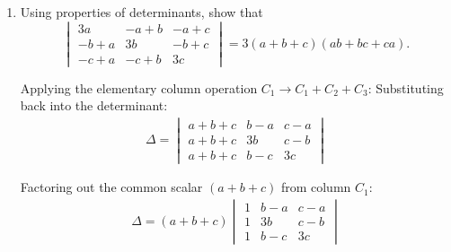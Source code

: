 \begin{enumerate}[label=\thesubsection.\arabic*, ref=\thesubsection.\theenumi]
\solution
Expressing $\cos^{-1}\left(\frac{4}{5}\right)$ in terms of $\tan^{-1}$:
\begin{align*}
	\cos^{-1}\frac{4}{5} = \tan^{-1}\left(\frac{\sqrt{1 - (4/5)^2}}{4/5}\right) = \tan^{-1}\left(\frac{3/5}{4/5}\right) = \tan^{-1}\frac{3}{4}
\end{align*}

Using the addition formula $\tan^{-1}x + \tan^{-1}y = \tan^{-1}\left(\dfrac{x+y}{1-xy}\right)$ for $xy = \frac{3}{4} \times \frac{2}{3} = \frac{1}{2} < 1$:
\begin{align*}
	\tan^{-1}\frac{3}{4} + \tan^{-1}\frac{2}{3} = \tan^{-1}\left(\frac{\frac{3}{4} + \frac{2}{3}}{1 - \frac{3}{4} \cdot \frac{2}{3}}\right) = \tan^{-1}\left(\frac{\frac{17}{12}}{1 - \frac{6}{12}}\right) = \tan^{-1}\left(\frac{17/12}{6/12}\right) \\ =\tan^{-1}\frac{17}{6}
\end{align*}

Let $\theta = \tan^{-1}\left(\frac{17}{6}\right)$, then $\sin\theta = \dfrac{17}{\sqrt{17^2 + 6^2}} = \dfrac{17}{\sqrt{289 + 36}} = \dfrac{17}{\sqrt{325}} = \dfrac{17}{5\sqrt{13}} = \dfrac{17\sqrt{13}}{65}$.


\item Using properties of determinants, show that
\[
\begin{vmatrix}
3a&-a+b&-a+c\\
-b+a&3b&-b+c\\
-c+a&-c+b&3c
\end{vmatrix}
=3(a+b+c)(ab+bc+ca).
\]

\solution


Applying the elementary column operation $C_1 \to C_1 + C_2 + C_3$:
Substituting back into the determinant:
\begin{align*}
	\Delta = \begin{vmatrix}
		a+b+c & b-a & c-a \\
		a+b+c & 3b & c-b \\
		a+b+c & b-c & 3c
	\end{vmatrix}
\end{align*}

Factoring out the common scalar $(a+b+c)$ from column $C_1$:
\begin{align*}
	\Delta = (a+b+c) \begin{vmatrix}
		1 & b-a & c-a \\
		1 & 3b & c-b \\
		1 & b-c & 3c
	\end{vmatrix}
\end{align*}


\end{enumerate}
